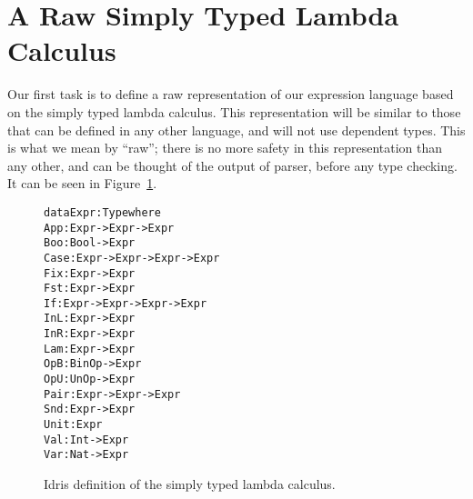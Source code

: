 \section{A Raw Simply Typed Lambda Calculus}
\label{sec:the-simply-typed-lambda-calculus}

Our first task is to define a raw representation of our expression language based on the simply typed lambda calculus. This representation will be similar to those that can be defined in any other language, and will not use dependent types. This is what we mean by ``raw''; there is no more safety in this representation than any other, and can be thought of the output of parser, before any type checking. It can be seen in Figure~\ref{fig:rstlc}.

\begin{center}
\begin{figure}
\begin{alltt}
data Expr : Type where
  App  : Expr -> Expr -> Expr
  Boo  : Bool -> Expr
  Case : Expr -> Expr -> Expr -> Expr
  Fix  : Expr -> Expr
  Fst  : Expr -> Expr
  If   : Expr -> Expr -> Expr -> Expr
  InL  : Expr -> Expr
  InR  : Expr -> Expr
  Lam  : Expr -> Expr
  OpB  : BinOp -> Expr
  OpU  : UnOp -> Expr
  Pair : Expr -> Expr -> Expr
  Snd  : Expr -> Expr
  Unit : Expr
  Val  : Int -> Expr
  Var  : Nat -> Expr
\end{alltt}
\caption{Idris definition of the simply typed lambda calculus.}
\label{fig:rstlc}
\end{figure}
\end{center}

